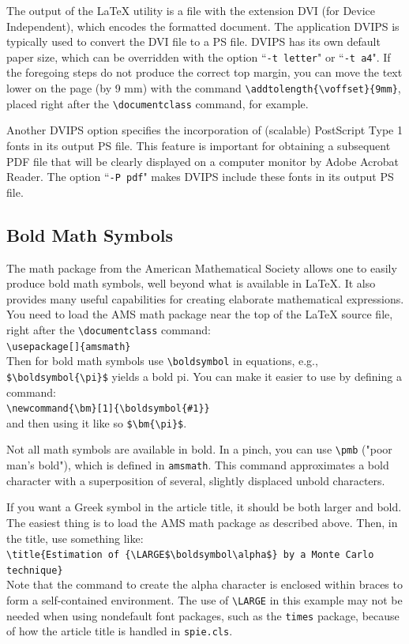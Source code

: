 \documentclass[a4paper]{spie}  %
\begin{document}
The output of the LaTeX utility is a file with the extension DVI (for Device Independent), which encodes the formatted document.  The application DVIPS is typically used to convert the DVI file to a PS file.  DVIPS has its own default paper size, which can be overridden with the option ``{\tt -t letter}" or ``{\tt -t a4}".  
If the foregoing steps do not produce the correct top margin, you can move the text lower on the page (by 9 mm) with the command \verb|\addtolength{\voffset}{9mm}|, placed right after the \verb|\documentclass| command, for example.

Another DVIPS option specifies the incorporation of (scalable) PostScript Type 1 fonts in its output PS file. This feature is important for obtaining a subsequent PDF file that will be clearly displayed on a computer monitor by Adobe Acrobat Reader.  The option ``{\tt -P pdf}" makes DVIPS include these fonts in its output PS file.

\subsection{Bold Math Symbols} 

The math package from the American Mathematical Society allows one to easily produce bold math symbols, well beyond what is available in LaTeX. It also provides many useful capabilities for creating elaborate mathematical expressions. You need to load the AMS math package near the top of the LaTeX source file, right after the \verb+\documentclass+ command:\\[1ex]
\verb+\usepackage[]{amsmath}+ \\[1ex]
Then for bold math symbols use \verb+\boldsymbol+ in equations, e.g., 
\verb+$\boldsymbol{\pi}$+ 
yields a bold pi.  You can make it easier to use by defining a command:\\[1ex]
\verb+\newcommand{\bm}[1]{\boldsymbol{#1}}+ \\[1ex]
and then using it like so \verb+$\bm{\pi}$+.

Not all math symbols are available in bold.  In a pinch, you can use \verb+\pmb+ ("poor man's bold"), which is defined in \verb+amsmath+. This command approximates a bold character with a superposition of several, slightly displaced unbold characters.

If you want a Greek symbol in the article title, it should be both larger and bold. The easiest thing is to load the AMS math package as described above. 
Then, in the title, use something like:\\[1ex]
\verb+\title{Estimation of {\LARGE$\boldsymbol\alpha$} by a Monte Carlo technique}+ \\[1ex]
Note that the command to create the alpha character is enclosed within braces to form a self-contained environment. The use of \verb+\LARGE+ in this example may not be needed when using nondefault font packages, such as the {\tt times} package, because of how the article title is handled in {\tt spie.cls}.
\end{document}
